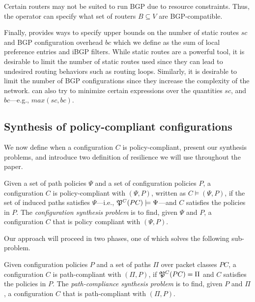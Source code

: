  Certain 
	routers may not be suited to run BGP due to resource
	constraints. Thus, the operator can specify what set of 
	routers $B\subseteq V$ are BGP-compatible. 
	

Finally, \name provides ways to specify upper bounds on the number of
static routes $sc$ and 
BGP configuration overhead $bc$ which we define as the 
sum of local preference entries and iBGP filters.
While static routes are a powerful tool, 
it is desirable to limit the number of static routes used since they
can lead to undesired routing behaviors such as routing loops.
Similarly, it is desirable to limit the number of BGP configurations
since they increase the complexity of the network.
\name can  also try to minimize 
certain expressions over the quantities $sc$, and $bc$---e.g., $max(sc, bc)$. 

\subsection{Synthesis of policy-compliant configurations}
We now define when a configuration $C$ is policy-compliant, present our synthesis problems, and introduce two definition of resilience we will use throughout the paper.
\begin{definition} \label{def:policycompliance}
	Given a set of path policies $\Psi$ and a set of configuration policies $P$,
	a configuration $C$ is policy-compliant with $(\Psi,P)$,  
	written as $C \models (\Psi,P)$, if the set of
	induced paths satisfies $\Psi$---i.e., $\mathfrak{P}^C(PC) \models \Psi$---and $C$ satisfies the policies in $P$.
	The \emph{configuration synthesis problem} is to find, given $\Psi$ and $P$,
a configuration $C$ that is policy compliant with $(\Psi,P)$.
\end{definition}

Our approach will proceed in two phases,
one of which solves the following sub-problem.  
\begin{definition} \label{def:pathcompliance}
Given configuration policies $P$
and a set of paths $\Pi$ over packet classes $PC$,
	a configuration $C$ is path-compliant with 
	$(\Pi,P)$,
	if $\mathfrak{P}^C(PC)=\Pi$ and $C$ satisfies the policies in $P$.
	The \emph{path-compliance synthesis problem} is to find, given $P$ and $\Pi$,
a configuration $C$ that is path-compliant with $(\Pi,P)$.
\end{definition}

